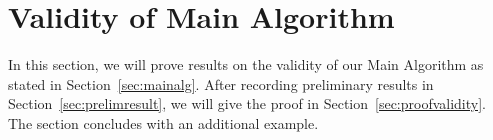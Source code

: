 \documentclass[11pt,reqno]{amsart}
\theoremstyle{plain}
\theoremstyle{definition}
\newcommand{\Q}{\bQ}
\newcommand{\PP}{\mathbf P}
\newcommand{\filip}[1]{{\textcolor{cyan}{Filip: [#1]}}}
\newcommand{\abbey}[1]{\textcolor{blue}{Abbey: #1}}
\begin{document}
\begin{comment}
\filip{Work in progress. If we prove $\deg q=d$, we are done. There's a more general question here, which I think is interesting: given a morphism $f:X\rightarrow \PP^1$ over $\Q$, with genus of $X$ at least 2, is it possible that there's infinitely many points of degree $<d$ in $f^{-1}(\PP^1(\Q))$. For $d=2$, the answer is no, and I think this might be the case in general. If anyone knows of a reference (or proof) of this, let me know; this would complete the proof of this lemma. } \abbey{Seems like you'd want some sort of strong form of Hilbert's irreducibility for this? I hadn't thought of this before... I believe there are infinitely many $c\in\Q$ such that $f-c$ is irreducible, which gives infinitely many degree $d$ points. So you want to know whether there are only finitely many $c$ such that $f-c$ is reducible? It looks like in some cases something like this is true (e.g., ``Finiteness results for Hilbert's irreducibility theorem" by M\"{u}ller), but not in general.}
\filip{Yes, this would be some strong form of Hilbert's irreducibility. Is there a single example, of an $X$ of genus $\geq 2$ and $f$, where $f$ does not factor as $f=f_1\circ f_2$  with $\deg f_i>1$ (otherwise there can be many counterexamples), where this is not true?}
\end{comment}







\section{Validity of Main Algorithm}
\label{sec:validity}

In this section, we will prove results on the validity of our Main Algorithm as stated in Section~\ref{sec:mainalg}. After recording preliminary results in Section~\ref{sec:prelimresult}, we will give the proof in Section~\ref{sec:proofvalidity}. The section concludes with an additional example.
\end{document}

